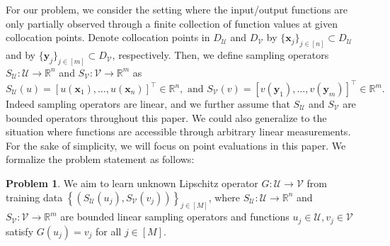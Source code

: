 \documentclass[11pt,twoside]{article}
\theoremstyle{plain}
\theoremstyle{definition}
\newtheorem{problem}{Problem}
\theoremstyle{remark}
\newcommand{\R}{\mathbb{R}}
\newcommand{\xb}{\mathbf{x}}
\newcommand{\yb}{\mathbf{y}}
\newcommand{\Uc}{\mathcal{U}}
\newcommand{\Vc}{\mathcal{V}}
\begin{document}
For our problem, we consider the setting where the input/output functions are only partially observed through a finite collection of function values at given collocation points. Denote collocation points in $D_\Uc$ and $D_\Vc$ by $\{\xb_j\}_{j\in[n]} \subset D_\Uc$ and by $\{\yb_j\}_{j\in[m]} \subset D_\Vc$, respectively. Then, we define sampling operators $S_\Uc:\Uc\to\R^n$ and $S_\Vc:\Vc\to\R^m$ as 
\begin{equation*}
S_\Uc(u) = [u(\xb_1),\dots,u(\xb_n)]^\top\in\R^n, \mbox{ and } S_\Vc(v) = [v(\yb_1),\dots,v(\yb_m)]^\top\in\R^m.
\end{equation*}
Indeed sampling operators are linear, and we further assume that $S_\Uc$ and $S_\Vc$ are bounded operators throughout this paper. We could also generalize to the situation where functions are accessible through arbitrary linear measurements. For the sake of simplicity, we will focus on point evaluations in this paper. We formalize the problem statement as follows:
\begin{problem}
We aim to learn unknown Lipschitz operator $G:\Uc\to\Vc$ from training data $\left\{( S_\Uc(u_j), S_\Vc(v_j))\right\}_{j\in[M]}$, where $S_\Uc:\Uc\to\R^n$ and $S_\Vc:\Vc\to\R^m$ are bounded linear sampling operators and functions $u_j\in\Uc, v_j\in\Vc$ satisfy $G(u_j)=v_j$ for all $j\in[M]$.    
\end{problem}
\end{document}
